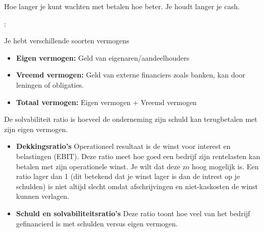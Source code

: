 \documentclass[a4paper,11pt]{article}
\begin{document}
\begin{description}
    {Hoe langer je kunt wachten met betalen hoe beter. Je houdt langer
    je cash.}


    \item[solvabiliteitratio's:]
    :

    Je hebt verschillende soorten vermogens
    \begin{itemize}
        \item \textbf{Eigen vermogen:} Geld van eigenaren/aandeelhouders
        \item \textbf{Vreemd vermogen:} Geld van externe financiers zoals banken, kan door
        leningen of obligaties.
        \item \textbf{Totaal vermogen:} Eigen vermogen + Vreemd vermogen
    \end{itemize}

    De solvabiliteit ratio is hoeveel de onderneming zijn schuld kan
    terugbetalen met zijn eigen vermogen.


    \begin{itemize}
        \item \textbf{Dekkingsratio's}
        {Operationeel resultaat is de winst voor interest en belastingen (EBIT).
        Deze ratio meet hoe goed een bedrijf zijn rentelasten kan betalen met zijn operationele winst.
        Je wilt dat deze zo hoog mogelijk is. Een ratio lager dan 1 (dit betekend dat je winst lager is dan de intrest op je
        schulden) is niet altijd slecht omdat afschrijvingen en niet-kaskosten de winst kunnen verlagen.}



        \item \textbf{Schuld en solvabiliteitsratio's}
        Deze ratio toont hoe veel van het bedrijf gefinancierd is 
        met schulden versus eigen vermogen.
        

\end{itemize}
\end{description}
\end{document}
